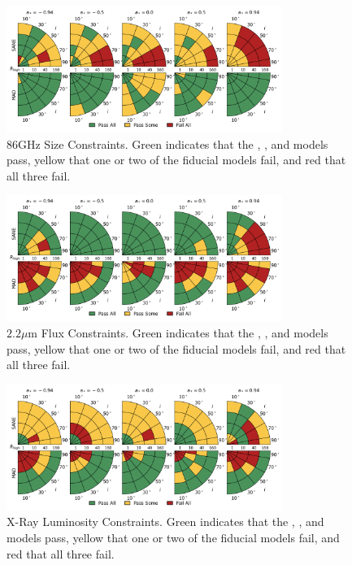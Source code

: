 \begin{figure}
  \centering
  \includegraphics[width=0.8\textwidth]{./figures/86GHz_size_Constraints.png}
  \caption{86GHz Size Constraints.  Green indicates that the \kharma, \bhac, and \hamr models pass, yellow that one or two of the fiducial models fail, and red that all three fail.}
  \label{fig:86GHz_size_pizza}
\end{figure}
\begin{figure}
  \centering
  \includegraphics[width=0.8\textwidth]{./figures/2um_flux_Constraints.png}
  \caption{$2.2\mu$m Flux Constraints.  Green indicates that the \kharma, \bhac, and \hamr models pass, yellow that one or two of the fiducial models fail, and red that all three fail.}
  \label{fig:2um_flux_pizza}
\end{figure}
\begin{figure}
  \centering
  \includegraphics[width=0.8\textwidth]{./figures/Xray_flux_Constraints.png}
  \caption{X-Ray Luminosity Constraints.  Green indicates that the \kharma, \bhac, and \hamr models pass, yellow that one or two of the fiducial models fail, and red that all three fail.}
  \label{fig:xray_pizza}
\end{figure}
